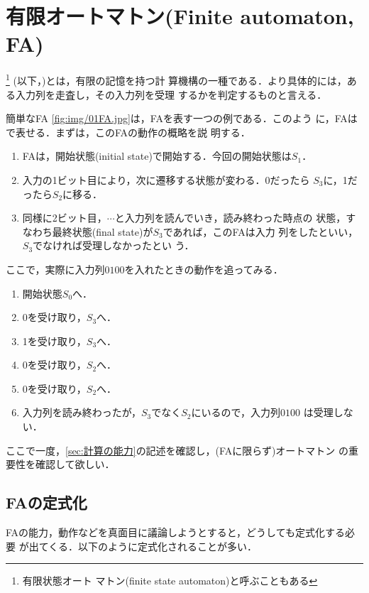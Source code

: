 
\section{有限オートマトン(Finite automaton, FA)}
  \footnote{有限状態オート
 マトン(finite state automaton)と呼ぶこともある} (以下，)とは，有限の記憶を持つ計
算機構の一種である．より具体的には，ある入力列を走査し，その入力列を受理
するかを判定するものと言える．


\begin{myexample}{簡単なFA}
 \figurename \ref{fig:img/01FA.jpg}は，FAを表す一つの例である．このよう
 に，FAはで表せる．まずは，このFAの動作の概略を説
 明する．
\begin{enumerate}
 \item FAは，開始状態(initial state)で開始する．今回の開始状態は$S_1$．
 \item 入力の1ビット目により，次に遷移する状態が変わる．0だったら
       $S_3$に，1だったら$S_2$に移る．
 \item 同様に2ビット目，$\cdots$と入力列を読んでいき，読み終わった時点の
       状態，すなわち最終状態(final state)が$S_3$であれば，このFAは入力
       列をしたといい，$S_3$でなければ受理しなかったとい
       う．
\end{enumerate}

 ここで，実際に入力列$0100$を入れたときの動作を追ってみる．
\begin{enumerate}
 \item 開始状態$S_0$へ．
 \item 0を受け取り，$S_3$へ．
 \item 1を受け取り，$S_3$へ．
 \item 0を受け取り，$S_2$へ．
 \item 0を受け取り，$S_2$へ．
 \item 入力列を読み終わったが，$S_3$でなく$S_2$にいるので，入力列$0100$
       は受理しない．
\end{enumerate}
\end{myexample}

ここで一度，\ref{sec:計算の能力}の記述を確認し，(FAに限らず)オートマトン
の重要性を確認して欲しい．

\subsection{FAの定式化} \label{FAの定式化}
FAの能力，動作などを真面目に議論しようとすると，どうしても定式化する必要
が出てくる．以下のように定式化されることが多い．

